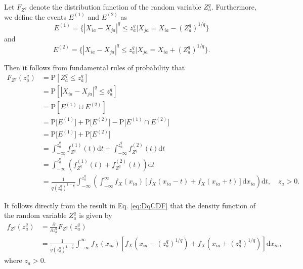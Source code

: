 \documentclass[10pt,letterpaper]{article}\usepackage[]{graphicx}\usepackage[]{color}
\begin{document}
Let $F_{Z^q}$ denote the distribution function of the random variable $Z^q_a$. Furthermore, we define the events $E^{(1)}$ and $E^{(2)}$ as
%
\begin{equation}\label{eq:E(1)}
E^{(1)} = \bigl\{|X_{ia}-X_{ja}|^q \leq z^q_a | X_{ja} = X_{ia} - \left(Z^q_a\right)^{1/q}\bigr\}
\end{equation}
%
and
%
\begin{equation}\label{eq:E(2)}
E^{(2)} = \bigl\{|X_{ia}-X_{ja}|^q \leq z^q_a | X_{ja} = X_{ia} + \left(Z^q_a\right)^{1/q}\bigr\}.
\end{equation}

Then it follows from fundamental rules of probability that
%
\begin{equation}\label{eq:DqCDF}
\begin{aligned}
F_{Z^q}(z^q_a) &= \text{P}\left[Z^q_a \leq z^q_a\right] \\
&= \text{P}\left[|X_{ia} - X_{ja}|^q \leq z^q_a\right] \\
&= \text{P}\left[E^{(1)} \cup E^{(2)}\right] \\
&= \text{P}\bigl[E^{(1)}\bigr] + \text{P}\bigl[E^{(2)}\bigr] - \text{P}\bigl[E^{(1)} \cap E^{(2)}\bigr] \\
&= \text{P}\bigl[E^{(1)}\bigr] + \text{P}\bigl[E^{(2)}\bigr] \\
&= \int_{-\infty}^{z^q_a} f^{(1)}_{Z^q}(t) \text{d}t + \int_{-\infty}^{z^q_a} f^{(2)}_{Z^q}(t) \text{d}t \\
&= \int_{-\infty}^{z^q_a} \left(f^{(1)}_{Z^q}(t) + f^{(2)}_{Z^q}(t)\right) \text{d}t \\
&= \frac{1}{q \left(z^q_a\right)^{1 - \frac{1}{q}}}\int_{-\infty}^{z^q_a} \left(\int_{-\infty}^{\infty}f_X(x_{ia})\left[f_X(x_{ia} - t) + f_X(x_{ia} + t)\right] \text{d}x_{ia}\right)\text{d}t, \quad z_a > 0.
\end{aligned}
\end{equation}

It follows directly from the result in Eq. \ref{eq:DqCDF} that the density function of the random variable $Z^q_a$ is given by
%
\begin{equation}\label{eq:DqPDF}
\begin{aligned}
f_{Z^q}(z^q_a) &= \frac{\partial}{\partial z^q_a} F_{Z^q}(z^q_a) \\
&= \frac{1}{q \left(z^q_a\right)^{1 - \frac{1}{q}}}\int_{-\infty}^{\infty} f_X(x_{ia})\left[f_X\left(x_{ia} - \left(z^q_a\right)^{1/q}\right) + f_X\left(x_{ia} + \left(z^q_a\right)^{1/q}\right)\right] \text{d}x_{ia},
\end{aligned}
\end{equation}
%
where $z_a > 0$.
\end{document}
